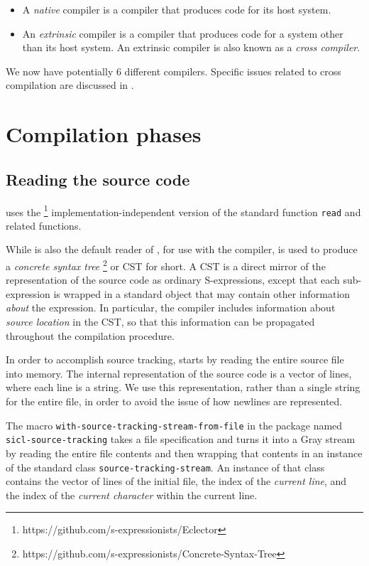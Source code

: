 \begin{itemize}
\item A \emph{native} compiler is a compiler that produces code for
  its host \commonlisp{} system.
\item An \emph{extrinsic} compiler is a compiler that produces code
  for a \commonlisp{} system other than its host system.  An extrinsic
  compiler is also known as a \emph{cross compiler}.
\end{itemize}

We now have potentially 6 different compilers.  Specific issues
related to cross compilation are discussed in
.

\section{Compilation phases}

\subsection{Reading the source code}

\sysname{} uses the \eclector{}%
\footnote{https://github.com/s-expressionists/Eclector}
implementation-independent version of the standard function
\texttt{read} and related functions.

While \eclector{} is also the default reader of \sysname{}, for use
with the compiler, \eclector{} is used to produce a \emph{concrete
  syntax tree}%
\footnote{https://github.com/s-expressionists/Concrete-Syntax-Tree} or
CST for short.  A CST is a direct mirror of the representation of the
source code as ordinary S-expressions, except that each sub-expression
is wrapped in a standard object that may contain other information
\emph{about} the expression.  In particular, the \sysname{} compiler
includes information about \emph{source location} in the CST, so that
this information can be propagated throughout the compilation
procedure.

In order to accomplish source tracking, \sysname{} starts by reading
the entire source file into memory.  The internal representation of
the source code is a vector of lines, where each line is a string.  We
use this representation, rather than a single string for the entire
file, in order to avoid the issue of how newlines are represented.

The macro \texttt{with-source-tracking-stream-from-file} in the
package named \texttt{sicl-source-tracking} takes a file
specification and turns it into a Gray stream by reading the entire
file contents and then wrapping that contents in an instance of the
standard class \texttt{source-tracking-stream}.  An instance of that
class contains the vector of lines of the initial file, the index of the
\emph{current line}, and the index of the \emph{current character}
within the current line.

